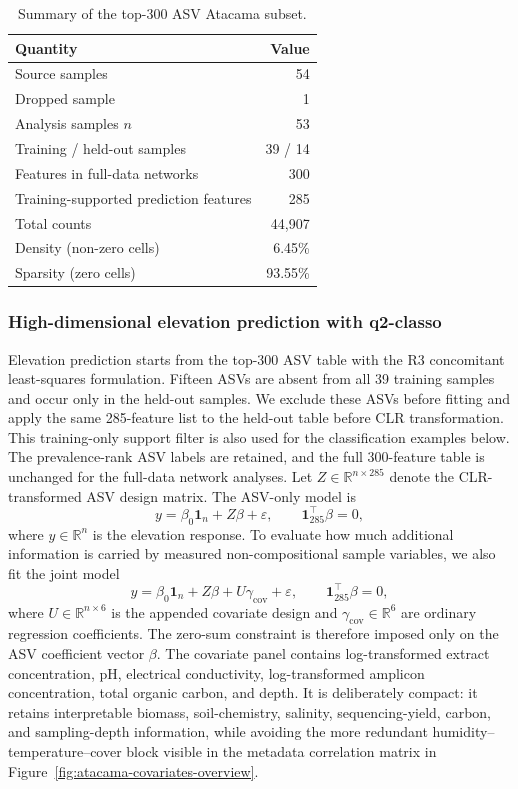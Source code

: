 \documentclass[11pt,a4paper]{article}
\newcommand{\R}{\mathbb{R}}
\newcommand{\bbeta}{\beta}
\begin{document}
\begin{table}[!htbp]
\centering
\small
\caption{Summary of the top-300 ASV Atacama subset.}
\label{tab:highdim-summary}
\begin{tabular}{@{}lr@{}}
\toprule
\textbf{Quantity} & \textbf{Value} \\
\midrule
Source samples & 54 \\
Dropped sample & 1 \\
Analysis samples $n$ & 53 \\
Training / held-out samples & 39 / 14 \\
Features in full-data networks & 300 \\
Training-supported prediction features & 285 \\
Total counts & 44{,}907 \\
Density (non-zero cells) & 6.45\% \\
Sparsity (zero cells) & 93.55\% \\
\bottomrule
\end{tabular}
\end{table}

\subsubsection{High-dimensional elevation prediction with q2-classo}
\label{sec:highdim-regression}

Elevation prediction starts from the top-300 ASV table with the
R3 concomitant least-squares formulation. Fifteen ASVs are absent from all
39 training samples and occur only in the held-out samples. We exclude these
ASVs before fitting and apply the same 285-feature list to the held-out table
before CLR transformation. This training-only support filter is also used for
the classification examples below. The prevalence-rank ASV labels are retained,
and the full 300-feature table is unchanged for the full-data network analyses.
Let $Z\in\R^{n\times 285}$ denote the
CLR-transformed ASV design matrix. The ASV-only model is
\[
    y = \beta_0 \mathbf{1}_n + Z\bbeta + \varepsilon,
    \qquad \mathbf{1}_{285}^{\top}\bbeta = 0,
\]
where $y\in\R^n$ is the elevation response. To evaluate how much additional
information is carried by measured non-compositional sample variables, we also
fit the joint model
\[
    y = \beta_0 \mathbf{1}_n + Z\bbeta + U\gamma_{\mathrm{cov}} + \varepsilon,
    \qquad \mathbf{1}_{285}^{\top}\bbeta = 0,
\]
where $U\in\R^{n\times 6}$ is the appended covariate design and
$\gamma_{\mathrm{cov}}\in\R^6$ are ordinary regression coefficients. The zero-sum constraint is
therefore imposed only on the ASV coefficient vector $\bbeta$. The covariate
panel contains log-transformed extract concentration, pH, electrical
conductivity, log-transformed amplicon concentration, total organic carbon, and
depth. It is deliberately compact: it retains interpretable biomass,
soil-chemistry, salinity, sequencing-yield, carbon, and sampling-depth
information, while avoiding the more redundant humidity--temperature--cover
block visible in the metadata correlation matrix in
Figure~\ref{fig:atacama-covariates-overview}.
\end{document}
